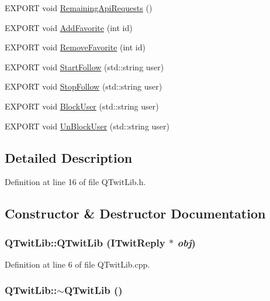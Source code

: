 \begin{CompactItemize}
\item 
EXPORT void \hyperlink{classQTwitLib_5f15bafdef1c85e75895347252c43de4}{RemainingApiRequests} ()
\item 
EXPORT void \hyperlink{classQTwitLib_0021eb836ece32c14cbe01d66bc8c79a}{AddFavorite} (int id)
\item 
EXPORT void \hyperlink{classQTwitLib_efabe0560a2117e232d48cc536d67e0e}{RemoveFavorite} (int id)
\item 
EXPORT void \hyperlink{classQTwitLib_a8195413e39929fd57e475db2d0ce193}{StartFollow} (std::string user)
\item 
EXPORT void \hyperlink{classQTwitLib_8f1cf32162899f244c32e5aa80efa03c}{StopFollow} (std::string user)
\item 
EXPORT void \hyperlink{classQTwitLib_1d58c50e49ec6fc89d64ed3118643a16}{BlockUser} (std::string user)
\item 
EXPORT void \hyperlink{classQTwitLib_59654af43516e00dce939c25e1d4a738}{UnBlockUser} (std::string user)
\end{CompactItemize}


\subsection{Detailed Description}


Definition at line 16 of file QTwitLib.h.

\subsection{Constructor \& Destructor Documentation}
\hypertarget{classQTwitLib_05a415b71f2ad7b6b5af3df5c070e9e2}{
\subsubsection{\setlength{\rightskip}{0pt plus 5cm}QTwitLib::QTwitLib ({\bf ITwitReply} $\ast$ {\em obj})}}
\label{classQTwitLib_05a415b71f2ad7b6b5af3df5c070e9e2}




Definition at line 6 of file QTwitLib.cpp.\hypertarget{classQTwitLib_8a2629b2c3afe96eccf411224019aabb}{
\subsubsection{\setlength{\rightskip}{0pt plus 5cm}QTwitLib::$\sim$QTwitLib ()}}
\label{classQTwitLib_8a2629b2c3afe96eccf411224019aabb}




